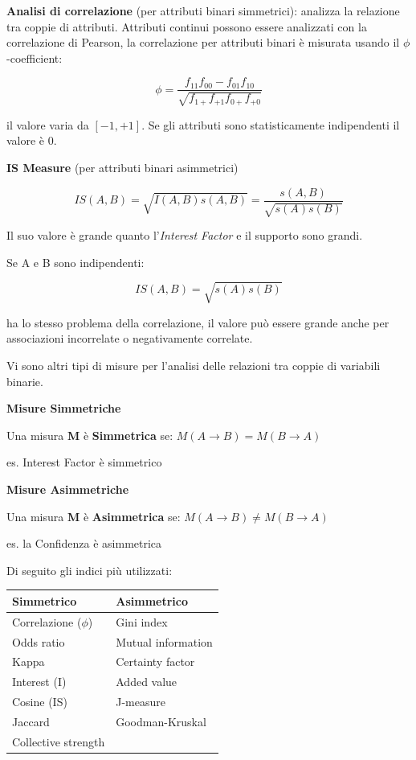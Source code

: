 \begin{defn}
	\textbf{Analisi di correlazione} (per attributi binari simmetrici): analizza la relazione tra coppie di attributi. Attributi continui possono essere analizzati con la correlazione di Pearson, la correlazione per attributi binari è misurata usando il $\phi$-coefficient:

	\[\phi = \frac{f_{11}f_{00} - f_{01}f_{10}}{\sqrt{f_{1+}f_{+1}f_{0+}f_{+0}}}\]
	
	il valore varia da $[-1,+1]$. Se gli attributi sono statisticamente indipendenti il valore è $0$.
\end{defn}

\begin{defn}
	\textbf{IS Measure} (per attributi binari asimmetrici)
	
	\[IS(A,B) = \sqrt{I(A,B)s(A,B)} = \frac{s(A,B)}{\sqrt{s(A)s(B)}}\]
	
	Il suo valore è grande quanto l'\textit{Interest Factor} e il supporto sono grandi.
	
	Se A e B sono indipendenti:
	
	\[IS(A,B) = \sqrt{s(A)s(B)}\]
	
	ha lo stesso problema della correlazione, il valore può essere grande anche per associazioni incorrelate o negativamente correlate.
\end{defn}

Vi sono altri tipi di misure per l'analisi delle relazioni tra coppie di variabili binarie.

\begin{defn} \textbf{Misure Simmetriche}

Una misura \textbf{M} è \textbf{Simmetrica} se: $M(A \rightarrow B) = M(B \rightarrow A)$

es. Interest Factor è simmetrico
\end{defn}

\begin{defn}\textbf{Misure Asimmetriche}
	
Una misura \textbf{M} è \textbf{Asimmetrica} se: $M(A \rightarrow B) \ne M(B \rightarrow A)$

es. la Confidenza è asimmetrica
\end{defn}

Di seguito gli indici più utilizzati:

\begin{table}[H]
	\centering
	\begin{tabular}{|p{5cm}|p{5cm}|}
		\hline
		Simmetrico & Asimmetrico \\
		\hline
		Correlazione ($\phi$) & Gini index \\
		Odds ratio & Mutual information \\
		Kappa & Certainty factor \\
		Interest (I) & Added value \\
		Cosine (IS) & J-measure \\
		Jaccard & Goodman-Kruskal \\
		Collective strength & \\
		\hline
	\end{tabular}
\end{table}

